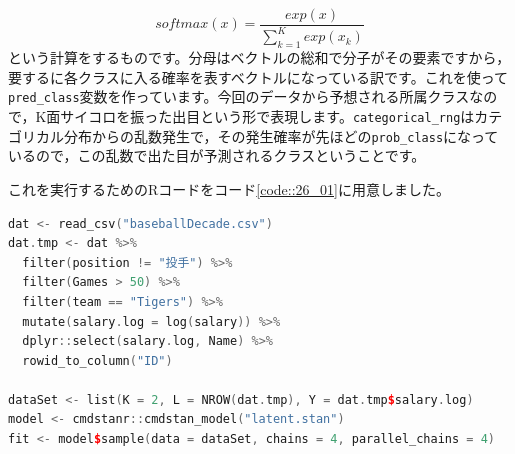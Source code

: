 \documentclass{ltjsbook}
\begin{document}
\begin{description}
    \[ softmax(x) = \frac{exp(x)}{\sum_{k=1}^K exp(x_k)}\] 
    という計算をするものです。分母はベクトルの総和で分子がその要素ですから，要するに各クラスに入る確率を表すベクトルになっている訳です。これを使って\verb|pred_class|変数を作っています。今回のデータから予想される所属クラスなので，K面サイコロを振った出目という形で表現します。\verb|categorical_rng|はカテゴリカル分布からの乱数発生で，その発生確率が先ほどの\verb|prob_class|になっているので，この乱数で出た目が予測されるクラスということです。
\end{description}
これを実行するためのRコードをコード\ref{code::26_01}に用意しました。
\begin{lstlisting}[language=c++,label={code::26_01},caption={混合分布モデルのコード}]
dat <- read_csv("baseballDecade.csv")
dat.tmp <- dat %>%
  filter(position != "投手") %>%
  filter(Games > 50) %>%
  filter(team == "Tigers") %>%
  mutate(salary.log = log(salary)) %>%
  dplyr::select(salary.log, Name) %>%
  rowid_to_column("ID")

dataSet <- list(K = 2, L = NROW(dat.tmp), Y = dat.tmp$salary.log)
model <- cmdstanr::cmdstan_model("latent.stan")
fit <- model$sample(data = dataSet, chains = 4, parallel_chains = 4)
\end{lstlisting}
\end{document}
